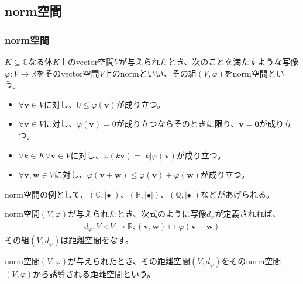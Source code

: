 \documentclass[dvipdfmx]{jsarticle}
\begin{document}
\subsection{norm空間}%
\subsubsection{norm空間}%
\begin{axs}[norm空間の公理]
$K \subseteq \mathbb{C}$なる体$K$上のvector空間$V$が与えられたとき、次のことを満たすような写像$\varphi:V \rightarrow \mathbb{R}$をそのvector空間$V$上のnormといい、その組$(V,\varphi)$をnorm空間という。
\begin{itemize}
\item
  $\forall\mathbf{v} \in V$に対し、$0 \leq \varphi\left( \mathbf{v} \right)$が成り立つ。
\item
  $\forall\mathbf{v} \in V$に対し、$\varphi\left( \mathbf{v} \right) = 0$が成り立つならそのときに限り、$\mathbf{v} = \mathbf{0}$が成り立つ。
\item
  $\forall k \in K\forall\mathbf{v} \in V$に対し、$\varphi\left( k\mathbf{v} \right) = |k|\varphi\left( \mathbf{v} \right)$が成り立つ。
\item
  $\forall\mathbf{v},\mathbf{w} \in V$に対し、$\varphi\left( \mathbf{v} + \mathbf{w} \right) \leq \varphi\left( \mathbf{v} \right) + \varphi\left( \mathbf{w} \right)$が成り立つ。
\end{itemize}
\end{axs}\par
norm空間の例として、$\left( \mathbb{C},| \bullet | \right)$、$\left( \mathbb{R},| \bullet | \right)$、$\left( \mathbb{Q},| \bullet | \right)$などがあげられる。
\begin{thm}\label{2.3.1.1}
norm空間$(V,\varphi)$が与えられたとき、次式のように写像$d_{\varphi}$が定義されれば、
\begin{align*}
d_{\varphi}:V \times V \rightarrow \mathbb{R};\left( \mathbf{v},\mathbf{w} \right) \mapsto \varphi\left( \mathbf{v} - \mathbf{w} \right)
\end{align*}
その組$\left( V,d_{\varphi} \right)$は距離空間をなす。
\end{thm}
\begin{dfn}
norm空間$(V,\varphi)$が与えられたとき、その距離空間$\left( V,d_{\varphi} \right)$をそのnorm空間$(V,\varphi)$から誘導される距離空間という。
\end{dfn}
\end{document}
